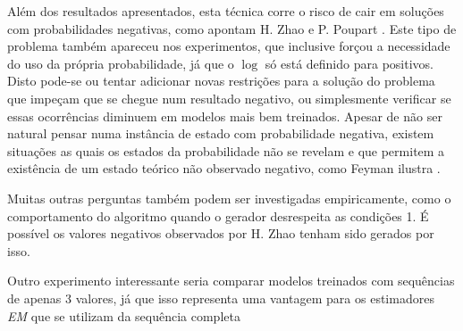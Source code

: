 \documentclass{subfiles}
\begin{document}
Além dos resultados apresentados, esta técnica corre o risco de cair em soluções com probabilidades negativas, como apontam H. Zhao e P. Poupart \autocite{Zhao:2014ASL}. Este tipo de problema também apareceu nos experimentos, que inclusive forçou a necessidade do uso da própria probabilidade, já que o $\log$ só está definido para positivos. Disto pode-se ou tentar adicionar novas restrições para a solução do problema que impeçam que se chegue num resultado negativo, ou simplesmente verificar se essas ocorrências diminuem em modelos mais bem treinados. Apesar de não ser natural pensar numa instância de estado com probabilidade negativa, existem situações as quais os estados da probabilidade não se revelam e que permitem a existência de um estado teórico não observado negativo, como Feyman ilustra \autocite{Feynman:1987FEYNP}.

Muitas outras perguntas também podem ser investigadas empiricamente, como o comportamento do algoritmo quando o gerador desrespeita as condições 1. É possível os valores negativos observados por H. Zhao tenham sido gerados por isso.

Outro experimento interessante seria comparar modelos treinados com sequências de apenas 3 valores, já que isso representa uma vantagem para os estimadores \textit{EM} que se utilizam da sequência completa
\end{document}
